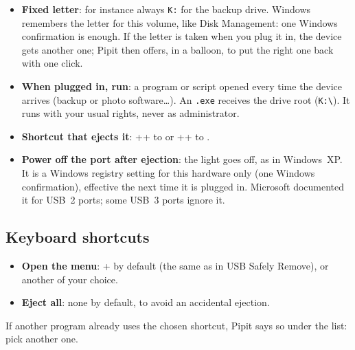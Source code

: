 \begin{itemize}
\item \textbf{Fixed letter}: for instance always \texttt{K:} for the backup drive. Windows
  remembers the letter for this volume, like Disk Management: one Windows confirmation is
  enough. If the letter is taken when you plug it in, the device gets another one; Pipit
  then offers, in a balloon, to put the right one back with one click.
\item \textbf{When plugged in, run}: a program or script opened every time the device
  arrives (backup or photo software…). An \texttt{.exe} receives the drive root
  (\texttt{K:\textbackslash}). It runs with your usual rights, never as administrator.
\item \textbf{Shortcut that ejects it}: ++ to
   or ++ to .
\item \textbf{Power off the port after ejection}: the light goes off, as in Windows~XP.
  It is a Windows registry setting for this hardware only (one Windows confirmation),
  effective the next time it is plugged in. Microsoft documented it for USB~2 ports; some
  USB~3 ports ignore it.
\end{itemize}

\subsection{Keyboard shortcuts}
\begin{itemize}
\item \textbf{Open the menu}: + by default (the same as in
  USB Safely Remove), or another of your choice.
\item \textbf{Eject all}: none by default, to avoid an accidental ejection.
\end{itemize}
If another program already uses the chosen shortcut, Pipit says so under the list:
pick another one.

